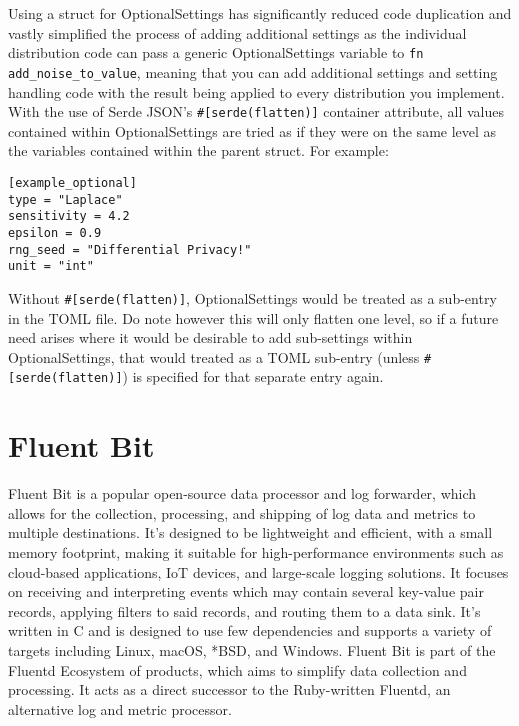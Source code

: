 Using a struct for OptionalSettings has significantly reduced code duplication and vastly simplified the process of adding additional settings as the individual distribution code can pass a generic OptionalSettings variable to \texttt{fn add_noise_to_value}, meaning that you can add additional settings and setting handling code with the result being applied to every distribution you implement. With the use of Serde JSON's \texttt{#[serde(flatten)]} container attribute, all values contained within OptionalSettings are tried as if they were on the same level as the variables contained within the parent struct. For example:

\begin{verbatim}
[example_optional]
type = "Laplace"
sensitivity = 4.2
epsilon = 0.9
rng_seed = "Differential Privacy!"
unit = "int"
\end{verbatim}
Without \texttt{#[serde(flatten)]}, OptionalSettings would be treated as a sub-entry in the TOML file. Do note however this will only flatten one level, so if a future need arises where it would be desirable to add sub-settings within OptionalSettings, that would treated as a TOML sub-entry (unless \texttt{#[serde(flatten)]}) is specified for that separate entry again.

\section{Fluent Bit}
Fluent Bit is a popular open-source data processor and log forwarder, which allows for the collection, processing, and shipping of log data and metrics to multiple destinations. It's designed to be lightweight and efficient, with a small memory footprint, making it suitable for high-performance environments such as cloud-based applications, IoT devices, and large-scale logging solutions. It focuses on receiving and interpreting events which may contain several key-value pair records, applying filters to said records, and routing them to a data sink. It's written in C and is designed to use few dependencies and supports a variety of targets including Linux, macOS, *BSD, and Windows. Fluent Bit is part of the Fluentd Ecosystem of products, which aims to simplify data collection and processing. It acts as a direct successor to the Ruby-written Fluentd, an alternative log and metric processor.

